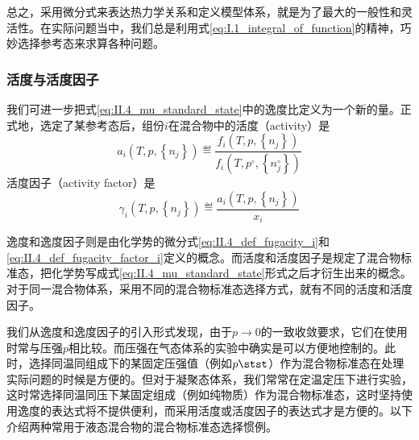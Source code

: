 \documentclass[main.tex]{subfiles}
\begin{document}
总之，采用微分式来表达热力学关系和定义模型体系，就是为了最大的一般性和灵活性。在实际问题当中，我们总是利用式\eqref{eq:I.1_integral_of_function}的精神，巧妙选择参考态来求算各种问题。

\subsubsection{活度与活度因子}
我们可进一步把式\eqref{eq:II.4_mu_standard_state}中的逸度比定义为一个新的量。正式地，选定了某参考态后，组份$i$在混合物中的活度（activity）是
\begin{equation}
    a_i\left(T,p,\left\{n_j\right\}\right)\eqdef\frac{f_i\left(T,p,\left\{n_j\right\}\right)}{f_i\left(T,p^\circ,\left\{n_j^\circ\right\}\right)}
\end{equation}
活度因子（activity factor）是
\begin{equation}
    \gamma_i\left(T,p,\left\{n_j\right\}\right)\eqdef\frac{a_i\left(T,p,\left\{n_j\right\}\right)}{x_i}
\end{equation}

逸度和逸度因子则是由化学势的微分式\eqref{eq:II.4_def_fugacity_i}和\eqref{eq:II.4_def_fugacity_factor_i}定义的概念。而活度和活度因子是规定了混合物标准态，把化学势写成式\eqref{eq:II.4_mu_standard_state}形式之后才衍生出来的概念。对于同一混合物体系，采用不同的混合物标准态选择方式，就有不同的活度和活度因子。

我们从逸度和逸度因子的引入形式发现，由于$p\rightarrow 0$的一致收敛要求，它们在使用时常与压强$p$相比较。而压强在气态体系的实验中确实是可以方便地控制的。此时，选择同温同组成下的某固定压强值（例如$p\stst$）作为混合物标准态在处理实际问题的时候是方便的。但对于凝聚态体系，我们常常在定温定压下进行实验，这时常选择同温同压下某固定组成（例如纯物质）作为混合物标准态，这时坚持使用逸度的表达式将不提供便利，而采用活度或活度因子的表达式才是方便的。以下介绍两种常用于液态混合物的混合物标准态选择惯例。
\end{document}
